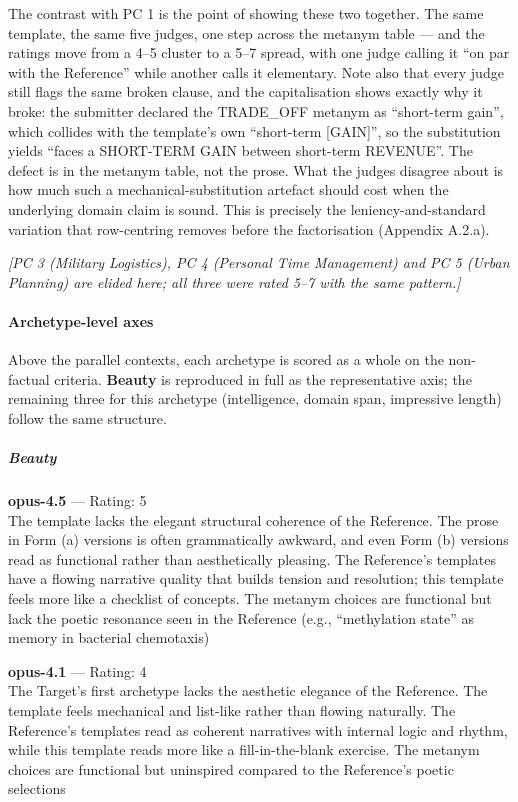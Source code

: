 The contrast with PC 1 is the point of showing these two together. The same template, the same five judges, one step across the metanym table --- and the ratings move from a 4--5 cluster to a 5--7 spread, with one judge calling it ``on par with the Reference'' while another calls it elementary. Note also that every judge still flags the same broken clause, and the capitalisation shows exactly why it broke: the submitter declared the TRADE\_OFF metanym as ``short-term gain'', which collides with the template's own ``short-term {[}GAIN{]}'', so the substitution yields ``faces a SHORT-TERM GAIN between short-term REVENUE''. The defect is in the metanym table, not the prose. What the judges disagree about is how much such a mechanical-substitution artefact should cost when the underlying domain claim is sound. This is precisely the leniency-and-standard variation that row-centring removes before the factorisation (Appendix A.2.a).

\emph{{[}PC 3 (Military Logistics), PC 4 (Personal Time Management) and PC 5 (Urban Planning) are elided here; all three were rated 5--7 with the same pattern.{]}}

\paragraph{Archetype-level axes}\label{archetype-level-axes}

Above the parallel contexts, each archetype is scored as a whole on the non-factual criteria. \textbf{Beauty} is reproduced in full as the representative axis; the remaining three for this archetype (intelligence, domain span, impressive length) follow the same structure.

\subparagraph{Beauty}\label{beauty}

\textbf{opus-4.5} --- Rating: 5\\
The template lacks the elegant structural coherence of the Reference. The prose in Form (a) versions is often grammatically awkward, and even Form (b) versions read as functional rather than aesthetically pleasing. The Reference's templates have a flowing narrative quality that builds tension and resolution; this template feels more like a checklist of concepts. The metanym choices are functional but lack the poetic resonance seen in the Reference (e.g., ``methylation state'' as memory in bacterial chemotaxis)

\textbf{opus-4.1} --- Rating: 4\\
The Target's first archetype lacks the aesthetic elegance of the Reference. The template feels mechanical and list-like rather than flowing naturally. The Reference's templates read as coherent narratives with internal logic and rhythm, while this template reads more like a fill-in-the-blank exercise. The metanym choices are functional but uninspired compared to the Reference's poetic selections

